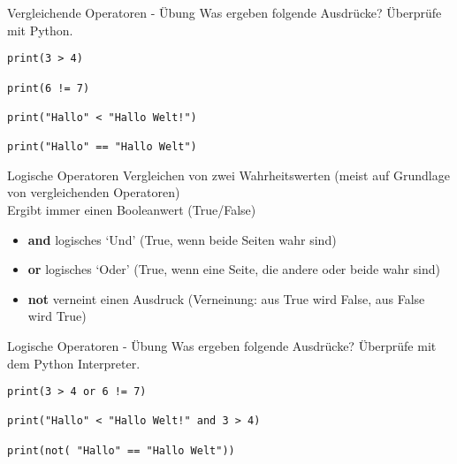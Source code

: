 \begin{frame}[fragile]{Vergleichende Operatoren - Übung}
Was ergeben folgende Ausdrücke? Überprüfe mit  Python.

\begin{lstlisting} 
print(3 > 4) 

print(6 != 7)

print("Hallo" < "Hallo Welt!") 

print("Hallo" == "Hallo Welt")

\end{lstlisting}
\end{frame}



\begin{frame}[fragile]{Logische Operatoren}
Vergleichen von zwei Wahrheitswerten (meist auf Grundlage von vergleichenden Operatoren)\\
Ergibt immer einen Booleanwert (True/False)

\begin{itemize}	
\item \textbf{and}  logisches `Und' (True, wenn beide Seiten wahr sind)
\item \textbf{or}  logisches `Oder' (True, wenn eine Seite, die andere oder beide wahr sind)
\item \textbf{not}  verneint einen Ausdruck (Verneinung: aus True wird False, aus False wird True)
\end{itemize}
\end{frame}

\begin{frame}[fragile]{Logische Operatoren - Übung}
Was ergeben folgende Ausdrücke? Überprüfe mit dem Python Interpreter.

\begin{lstlisting} 
print(3 > 4 or 6 != 7)

print("Hallo" < "Hallo Welt!" and 3 > 4)

print(not( "Hallo" == "Hallo Welt"))
\end{lstlisting}
\end{frame}







